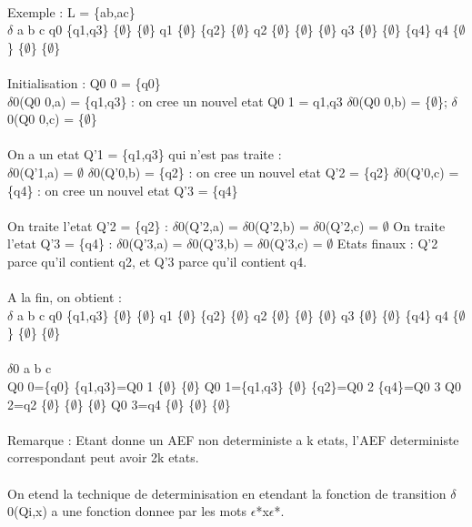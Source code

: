 \documentclass[5pt]{article}
\begin{document}
\begin{scriptsize}
\\
Exemple : L = \{ab,ac\}\\
$\delta$ a b c q0 \{q1,q3\} \{$\emptyset$\} \{$\emptyset$\} q1 \{$\emptyset$\} \{q2\} \{$\emptyset$\} q2 \{$\emptyset$\} \{$\emptyset$\} \{$\emptyset$\} q3 \{$\emptyset$\} \{$\emptyset$\} \{q4\} q4 \{$\emptyset$\} \{$\emptyset$\} \{$\emptyset$\}\\
\\
Initialisation : Q0 0 = \{q0\}\\
$\delta$0(Q0 0,a) = \{q1,q3\} : on cree un nouvel etat Q0 1 = {q1,q3}
$\delta$0(Q0 0,b) = \{$\emptyset$\}; $\delta$0(Q0 0,c) = \{$\emptyset$\}\\
\\
On a un etat Q'1 = \{q1,q3\} qui n’est pas traite :\\
$\delta$0(Q'1,a) = $\emptyset$ $\delta$0(Q'0,b) = \{q2\} : on cree un nouvel etat Q'2 = \{q2\} $\delta$0(Q'0,c) = \{q4\} : on cree un nouvel etat Q'3 = \{q4\}\\
\\
On traite l’etat Q'2 = \{q2\} : $\delta$0(Q'2,a) = $\delta$0(Q'2,b) = $\delta$0(Q'2,c) = $\emptyset$ On traite l’etat Q'3 = \{q4\} : $\delta$0(Q'3,a) = $\delta$0(Q'3,b) = $\delta$0(Q'3,c) = $\emptyset$ Etats finaux : Q'2 parce qu’il contient q2, et Q'3 parce qu’il contient q4.\\
\\
A la fin, on obtient :\\
$\delta$ a b c q0 \{q1,q3\} \{$\emptyset$\} \{$\emptyset$\} q1 \{$\emptyset$\} \{q2\} \{$\emptyset$\} q2 \{$\emptyset$\} \{$\emptyset$\} \{$\emptyset$\} q3 \{$\emptyset$\} \{$\emptyset$\} \{q4\} q4 \{$\emptyset$\} \{$\emptyset$\} \{$\emptyset$\}\\
\\
$\delta$0 a b c\\
Q0 0=\{q0\} \{q1,q3\}=Q0 1 \{$\emptyset$\} \{$\emptyset$\} Q0 1=\{q1,q3\} \{$\emptyset$\} \{q2\}=Q0 2 \{q4\}=Q0 3 Q0 2=q2 \{$\emptyset$\} \{$\emptyset$\} \{$\emptyset$\} Q0 3=q4 \{$\emptyset$\} \{$\emptyset$\} \{$\emptyset$\}\\
\\
Remarque : Etant donne un AEF non deterministe a k etats, l’AEF deterministe correspondant peut avoir 2k etats.\\
\\
On etend la technique de determinisation en etendant la fonction de transition $\delta$0(Qi,x) a une fonction donnee par les mots $\epsilon$*x$\epsilon$*.\\

\end{scriptsize}
\end{document}
